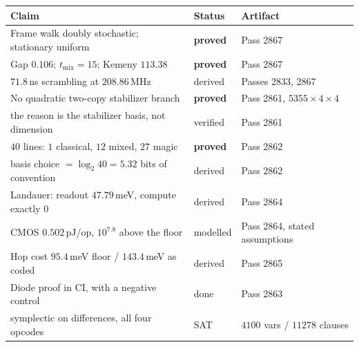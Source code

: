 \documentclass[11pt,a4paper]{article}
\begin{document}
{\footnotesize
\begin{center}
\begin{tabular}{@{}p{8.4cm}p{2.4cm}p{3.9cm}@{}}
\toprule
\textbf{Claim} & \textbf{Status} & \textbf{Artifact}\\
\midrule
Frame walk doubly stochastic; stationary uniform & \textbf{proved} & Pass 2867\\
Gap $0.106$; $t_{\mathrm{mix}}=15$; Kemeny $113.38$ & \textbf{proved} & Pass 2867\\
\quad $71.8$\,ns scrambling at $208.86$\,MHz & derived & Passes 2833, 2867\\
No quadratic two-copy stabilizer branch & \textbf{proved} & Pass 2861, $5355{\times}4{\times}4$\\
\quad the reason is the stabilizer basis, not dimension & verified & Pass 2861\\
$40$ lines: $1$ classical, $12$ mixed, $27$ magic & \textbf{proved} & Pass 2862\\
\quad basis choice $=\log_2 40=5.32$ bits of convention & derived & Pass 2862\\
Landauer: readout $47.79$\,meV, compute exactly $0$ & derived & Pass 2864\\
CMOS $0.502$\,pJ/op, $10^{7.8}$ above the floor & \textcolor{bad}{modelled} & Pass 2864, stated assumptions\\
Hop cost $95.4$\,meV floor / $143.4$\,meV as coded & derived & Pass 2865\\
Diode proof in CI, with a negative control & done & Pass 2863\\
\quad symplectic on differences, all four opcodes & SAT & $4100$ vars / $11278$ clauses\\
\bottomrule
\end{tabular}
\end{center}}

\end{document}
